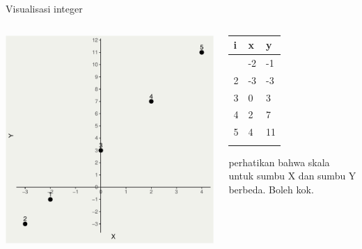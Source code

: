 \documentclass[
  ignorenonframetext,
]{beamer}
\begin{document}
\begin{frame}{Visualisasi integer}
\label{visualisasi-integer}
\begin{columns}[T]
\begin{column}{0.47\textwidth}
\includegraphics{index_files/figure-beamer/unnamed-chunk-2-1.pdf}
\end{column}

\begin{column}{0.47\textwidth}
\begin{longtable}[]{@{}lll@{}}
\toprule\noalign{}
i & x & y \\
\midrule\noalign{}
\endhead
1 & -2 & -1 \\
2 & -3 & -3 \\
3 & 0 & 3 \\
4 & 2 & 7 \\
5 & 4 & 11 \\
\bottomrule\noalign{}
\end{longtable}

perhatikan bahwa skala untuk sumbu X dan sumbu Y berbeda. Boleh kok.
\end{column}
\end{columns}
\end{frame}
\end{document}
